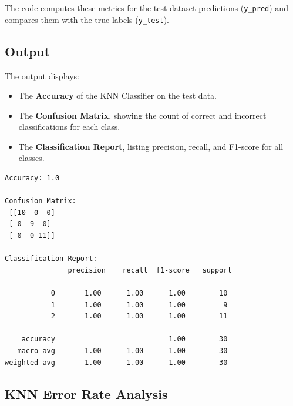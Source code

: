 \documentclass[11pt,a4paper]{report}
\begin{document}
The code computes these metrics for the test dataset predictions (\texttt{y\_pred}) and compares them with the true labels (\texttt{y\_test}).

\subsection*{Output}
The output displays:

\begin{itemize}
  \item The \textbf{Accuracy} of the KNN Classifier on the test data.
  \item The \textbf{Confusion Matrix}, showing the count of correct and incorrect classifications for each class.
  \item The \textbf{Classification Report}, listing precision, recall, and F1-score for all classes.
\end{itemize}
    \begin{Verbatim}[commandchars=\\\{\}]
Accuracy: 1.0

Confusion Matrix:
 [[10  0  0]
 [ 0  9  0]
 [ 0  0 11]]

Classification Report:
               precision    recall  f1-score   support

           0       1.00      1.00      1.00        10
           1       1.00      1.00      1.00         9
           2       1.00      1.00      1.00        11

    accuracy                           1.00        30
   macro avg       1.00      1.00      1.00        30
weighted avg       1.00      1.00      1.00        30

    \end{Verbatim}


\subsection{KNN Error Rate Analysis}
\end{document}
